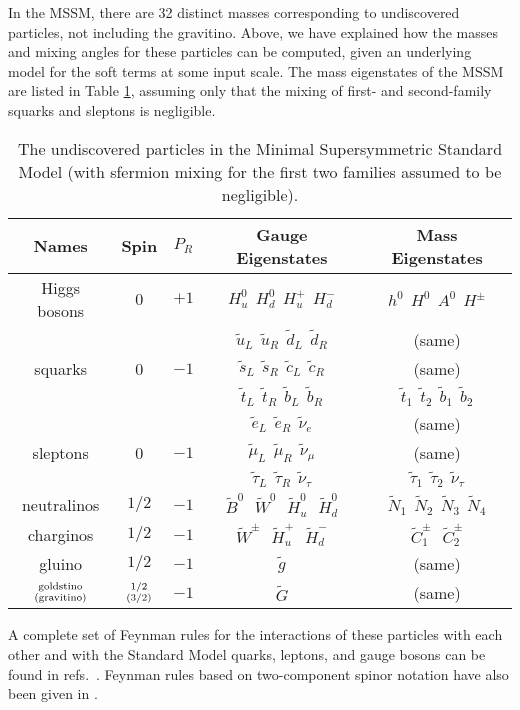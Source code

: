 \documentclass[12pt]{article}
\def\stilde{\widetilde}
\begin{document}
In the MSSM, there are 32 distinct masses corresponding to undiscovered 
particles, not including the gravitino. Above, we have explained 
how the masses and mixing angles for these particles can be computed, 
given an underlying model for the soft terms at some input scale. 
The mass eigenstates of the MSSM are listed in Table
\ref{tab:undiscovered}, assuming 
only that the mixing of first- and second-family squarks and sleptons is 
negligible.%
\renewcommand{\arraystretch}{1.4}
\begin{table}[tb]
\begin{center}
\begin{tabular}{|c|c|c|c|c|}
\hline
Names & Spin & $P_R$ & Gauge Eigenstates & Mass Eigenstates \\
\hline\hline
Higgs bosons & 0 & $+1$ & 
$H_u^0\>\> H_d^0\>\> H_u^+ \>\> H_d^-$ 
& 
$h^0\>\> H^0\>\> A^0 \>\> H^\pm$
\\ \hline
& & &${\stilde u}_L\>\> {\stilde u}_R\>\> \stilde d_L\>\> \stilde d_R$&(same)
\\
squarks& 0&$-1$& ${\stilde s}_L\>\> {\stilde s}_R\>\> \stilde c_L\>\>
\stilde c_R$& (same) \\
& & &
$\stilde t_L \>\>\stilde t_R \>\>\stilde b_L\>\> \stilde b_R$ 
&
${\stilde t}_1\>\> {\stilde t}_2\>\> \stilde b_1\>\> \stilde b_2$
\\ \hline
& & &${\stilde e}_L\>\> {\stilde e}_R \>\>\stilde \nu_e$&(same) 
\\
sleptons& 0&$-1$&${\stilde \mu}_L\>\>{\stilde \mu}_R\>\>\stilde\nu_\mu$&(same)
\\
& & &
$\stilde \tau_L\>\> \stilde \tau_R \>\>\stilde \nu_\tau$ 
&
${\stilde \tau}_1 \>\>{\stilde \tau}_2 \>\>\stilde \nu_\tau$
\\
\hline
neutralinos & $1/2$&$-1$ & 
$\stilde B^0 \>\>\>\stilde W^0\>\>\> \stilde H_u^0\>\>\> \stilde H_d^0$   
&
$\stilde N_1\>\> \stilde N_2 \>\>\stilde N_3\>\> \stilde N_4$ 
\\
\hline
charginos & $1/2$&$-1$ & 
$\stilde W^\pm\>\>\> \stilde H_u^+ \>\>\>\stilde H_d^-$ 
&
$\stilde C_1^\pm\>\>\>\stilde C_2^\pm $ 
\\
\hline
gluino & $1/2$&$-1$ &$\stilde g$  &(same) \\
\hline
${\rm goldstino}\atop{\rm (gravitino)}$ & ${1/2}\atop{(3/2)}$&$-1$&$\stilde 
G$  &(same) \\
\hline
\end{tabular}
\caption{The undiscovered particles in the Minimal Supersymmetric Standard 
Model (with sfermion mixing for the first two families assumed to be 
negligible). 
\label{tab:undiscovered}}
\vspace{-0.4cm}
\end{center}
\end{table}%
A complete set of Feynman rules for the 
interactions of these particles with each other and with the Standard 
Model quarks, leptons, and gauge bosons can be found in 
refs.~\cite{HaberKanereview,GunionHaber}. 
Feynman rules 
based on two-component spinor notation have also  been given in 
\cite{DHM}.
\end{document}
